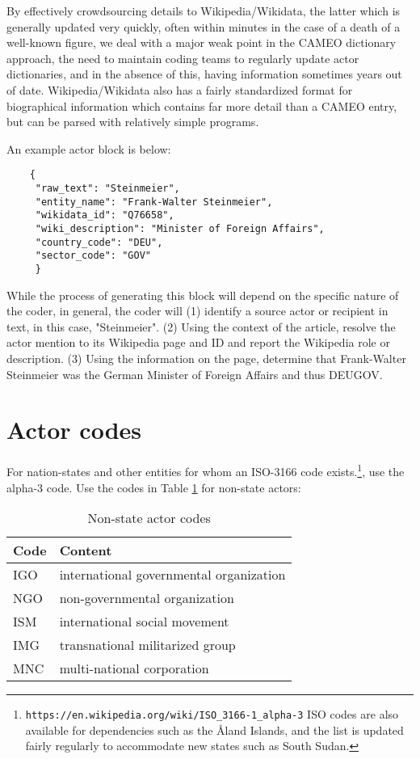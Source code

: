 \documentclass[11pt]{report}
\newcommand{\txt}[1]{\texttt{#1}}
\newcommand{\fn}[1]{\footnote{#1}}
\begin{document}
By effectively crowdsourcing details to Wikipedia/Wikidata, the latter which is generally updated very quickly, often within minutes in the case of a death of a well-known figure, we deal with a major weak point in the CAMEO dictionary approach,  the need to maintain coding teams to regularly update actor dictionaries, and in the absence of this, having information sometimes years out of date. Wikipedia/Wikidata also has a fairly standardized format for biographical information which contains far more detail than a CAMEO entry, but can be parsed with relatively simple programs.

An example actor block is below:

\begin{verbatim}
	{
	 "raw_text": "Steinmeier",
	 "entity_name": "Frank-Walter Steinmeier",
	 "wikidata_id": "Q76658",
	 "wiki_description": "Minister of Foreign Affairs",
	 "country_code": "DEU",
	 "sector_code": "GOV"
	 }
\end{verbatim}

While the process of generating this block will depend on the specific nature of the coder, in general, the coder will (1) identify a source actor or recipient in text, in this case, "Steinmeier". (2) Using the context of the article, resolve the actor mention to its Wikipedia page and ID and report the Wikipedia role or description. (3) Using the information on the page, determine that Frank-Walter Steinmeier was the German Minister of Foreign Affairs and thus DEUGOV.


\section{Actor codes}

For nation-states and other entities for whom an ISO-3166 code exists.\fn{\txt{https://en.wikipedia.org/wiki/ISO\_3166-1\_alpha-3} ISO codes are also available for dependencies such as the \AA land Islands, and the list is updated fairly regularly to accommodate new states such as South Sudan.}, use the alpha-3 code. Use the codes in Table \ref{tab:nonstate} for non-state actors:

\begin{table}[htp]
\caption{Non-state actor codes}
\begin{center}
\begin{tabular}{|l|l|}
\hline
Code & Content \\
\hline
IGO   &   international governmental organization\\
NGO &   non-governmental organization\\
ISM           &   international social movement\\
IMG            &   transnational militarized group\\
MNC            &   multi-national corporation\\
\hline
\end{tabular}
\end{center}
\label{tab:nonstate}
\end{table}%
\end{document}
